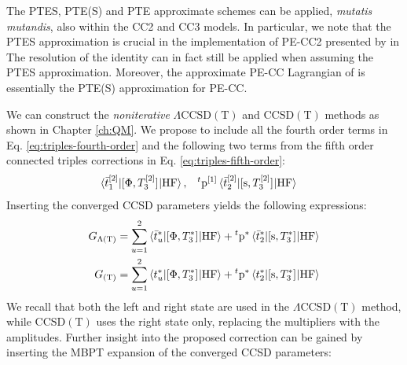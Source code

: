 The \acrshort{PTES}, \acrshort{PTE(S)} and \acrshort{PTE} approximate
schemes can be applied, \emph{mutatis mutandis}, also within the
\acrshort{CC2} and \acrshort{CC3} models.\autocite{Caricato2011-tx, Schwabe2012-cf, Krause2016-ee}
In particular, we note that the \acrshort{PTES} approximation is crucial
in the implementation of \acrshort{PE}-\acrshort{CC2} presented by
\citeauthor{Schwabe2012-cf} in 
The resolution of the identity can in fact still be applied when
assuming the \acrshort{PTES} approximation.
Moreover, the approximate \acrshort{PE}-\acrshort{CC} Lagrangian of
\citeauthor{Krause2016-ee} is essentially the \acrshort{PTE(S)}
approximation for \acrshort{PE}-\acrshort{CC}.\autocite{Krause2016-ee}

We can construct the \emph{noniterative}
$\Lambda\text{CCSD}(\text{T})$\autocite{Kucharski1998-qq,
Kucharski1998-oi, Crawford1998-vj} and
$\text{CCSD}(\text{T})$\autocite{Raghavachari1989-bn} methods as shown
in Chapter \ref{ch:QM}.
We propose to include all the fourth order terms in Eq.
\eqref{eq:triples-fourth-order} and the following two terms from the
fifth order connected triples corrections in Eq.
\eqref{eq:triples-fifth-order}:
\begin{alignat}{2}
 \braket{\bar{t}_{1}^{[2]} | [ \Phi, T_3^{[2]} ]^{} | \mathrm{HF}},
    \quad&
 {}^t\mathrm{p}^{[1]}\braket{\bar{t}_{2}^{[2]} | [ \mathrm{s}, T_3^{[2]} ]^{} | \mathrm{HF}}
\end{alignat}
Inserting the converged \acrshort{CCSD} parameters yields the following
expressions:
\begin{subequations}\label{eq:g-parentheses-t}
 \begin{align}
  G_{\Lambda(\text{T})}
  &=
    \sum_{u=1}^2\braket{\bar{t}_{u}^{*}| [ \Phi, T_3^{*} ]^{} | \mathrm{HF}}
    + {}^t\mathrm{p}^{*}\braket{\bar{t}_{2}^{*} | [ \mathrm{s}, T_3^{*} ]^{} | \mathrm{HF}} \\
  G_{(\text{T})}
 &=
    \sum_{u=1}^2\braket{t_{u}^{*}|[ \Phi, T_3^{*} ]^{} | \mathrm{HF}}
    + {}^t\mathrm{p}^{*}\braket{t_{2}^{*} | [ \mathrm{s}, T_3^{*} ]^{} | \mathrm{HF}}
 \end{align}
\end{subequations}
We recall that both the left and right state are used in the
$\Lambda\text{CCSD}(\text{T})$ method, while $\text{CCSD}(\text{T})$
uses the right state only, replacing the multipliers with the
amplitudes.
Further insight into the proposed correction can be gained by
inserting the \acrshort{MBPT} expansion of the converged \acrshort{CCSD}
parameters:\autocite{Stanton1997-lx, Koch1997-nm,
Eriksen2014-gy, Eriksen2015-il, Kristensen2016-od}
